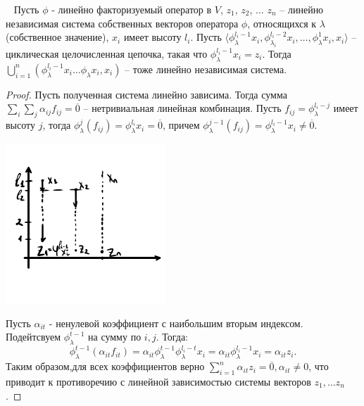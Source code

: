 \begin{lemma}~
    Пусть $\phi$ - линейно факторизуемый оператор в $V$, 
    $z_1$, $z_2$, $\dots$ $z_n$ -- линейно независимая система собственных векторов оператора $\phi$, относящихся к $\lambda$ (собственное значение), $x_i$ имеет высоту $l_i$.
    Пусть $\langle \phi_{\lambda}^{l_i-1} x_i, \phi_{\lambda_i}^{l_i-2} x_i, \dots, \phi_{\lambda}^{1} x_i, x_i \rangle$ -- циклическая целочисленная цепочка, такая что $\phi_{\lambda}^{l_i - 1} x_i = z_i$. Тогда $\bigcup\limits_{i = 1}^n (\phi_{\lambda}^{l_i - 1} x_i \dots \phi_{\lambda} x_i, x_i)$ -- тоже линейно независимая система.
\end{lemma}

\begin{proof}
    Пусть полученная система линейно зависима. Тогда сумма $\displaystyle\sum_{i} \displaystyle\sum_{j} \alpha_{ij} f_{ij} = \overline{0}$ -- нетривиальная линейная комбинация.
    Пусть $f_{ij} = \phi_{\lambda}^{l_i - j}$ имеет высоту $j$, тогда $\phi_{\lambda}^j(f_{ij}) = \phi_{\lambda}^{l_i} x_i = \overline{0}$, причем  $\phi_{\lambda}^{j - 1}(f_{ij}) = \phi_{\lambda}^{l_i - 1} x_i \neq \overline{0}$.
    \begin{center}
        \includegraphics[width = 0.45\textwidth]{images/lec6_2.PNG}
    \end{center}
    Пусть $\alpha_{it}$ - ненулевой коэффициент с наибольшим вторым индексом. Подейтсвуем $\phi_{\lambda}^{t-1}$ на сумму по $i, j$.
    Тогда: $$\phi_{\lambda}^{t-1} (\alpha_{it} f_{it}) = \alpha_{it} \phi_{\lambda}^{t-1} \phi_{\lambda}^{l_i - t} x_i 
    = \alpha_{it} \phi_{\lambda}^{l_i - 1}x_i = \alpha_{it} z_i.$$ Таким образом,для всех коэффициентов верно $\displaystyle\sum_{i = 1}^n \alpha_{it}z_i = \overline{0}, \alpha_{it} \neq 0$, что приводит к противоречию с линейной зависимостью системы векторов $z_1, \dots z_n$.
\end{proof}

